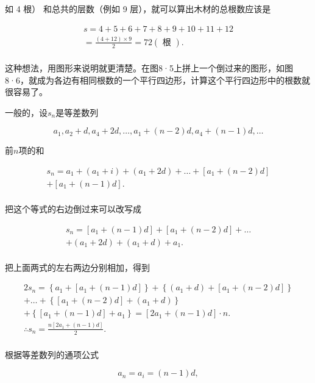 如 4 根） 和总共的层数（例如 9 层），就可以算出木材的总根数应该是

\[
\begin{array}{l} s = 4 + 5 + 6 + 7 + 8 + 9 + 10 + 11 + 12 \\ = \frac{(4 + 12) \times 9}{2} = 72 (\text{ 根 }). \\ \end{array}
\]

这种想法，用图形来说明就更清楚。在图8·5上拼上一个倒过来的图形，如图8·6，就成为各边有相同根数的一个平行四边形，计算这个平行四边形中的根数就很容易了。

一般的，设\(s_{n}\)是等差数列

\[
a_{1}, a_{2} + d, a_{4} + 2 d, \dots, a_{1} + (n - 2) d, a_{4} + (n - 1) d, \dots
\]

前\(n\)项的和

\[
\begin{array}{l} s_{n} = a_{1} + (a_{1} + i) + (a_{1} + 2 d) + \dots + [ a_{1} + (n - 2) d ] \\ + \left[ a_{1} + (n - 1) d \right]. \\ \end{array}
\]

把这个等式的右边倒过来可以改写成

\[
\begin{array}{l} s_{n} = \left[ a_{1} + (n - 1) d \right] + \left[ a_{1} + (n - 2) d \right] + \dots \\ + \left(a_{1} + 2 d\right) + \left(a_{1} + d\right) + a_{1}. \\ \end{array}
\]

把上面两式的左右两边分别相加，得到

\[
\begin{array}{l} 2 s_{n} = \left\{a_{1} + \left[ a_{1} + (n - 1) d \right] \right\} + \left\{\left(a_{1} + d\right) + \left[ a_{1} + (n - 2) d \right] \right\} \\ + \dots + \left\{\left[ a_{1} + (n - 2) d \right] + \left(a_{1} + d\right) \right\} \\ + \left\{\left[ a_{1} + (n - 1) d \right] + a_{1} \right\} = \left[ 2 a_{1} + (n - 1) d \right] \cdot n. \\ \therefore s_{n} = \frac{n [ 2 a_{1} + (n - 1) d ]}{2}. \tag {II} \\ \end{array}
\]

根据等差数列的通项公式

\[
a_{n} = a_{i} = (n - 1) d,
\]

